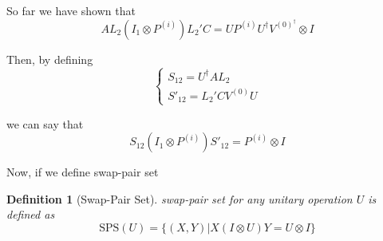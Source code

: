 \documentclass{report}
\newtheorem{definition}{Definition}
\begin{document}
So far we have shown that
\begin{equation}
  AL_2 (I_1 \otimes P^{(i)}) L_2' C = U P^{(i)} U^\dagger V^{(0)^\dagger} \otimes I
\end{equation}

Then, by defining 
\begin{equation}
  \begin{cases} S_{12} = U^\dagger AL_2 \\
    S'_{12} = L_2' C V^{(0)} U
  \end{cases}
\end{equation}

we can say that
\begin{equation}
  S_{12} (I_1 \otimes P^{(i)}) S'_{12} = P^{(i)} \otimes I
\end{equation}


Now, if we define swap-pair set

\begin{definition}[Swap-Pair Set]
  swap-pair set for any unitary operation $U$ is defined as
  \begin{equation}
    \mathrm{SPS}(U) = \{ (X, Y) | X(I \otimes U)Y = U \otimes I \}
  \end{equation}
\end{definition}
\end{document}
